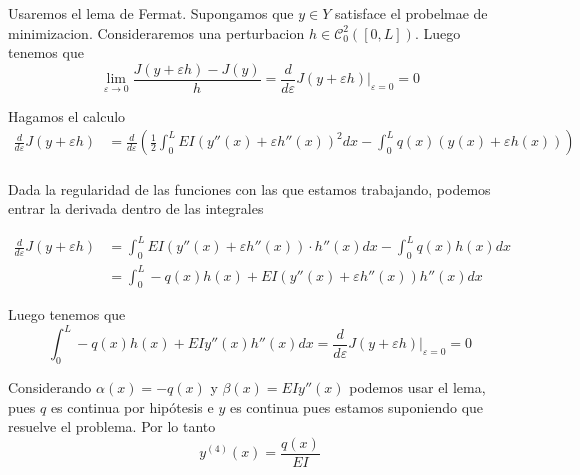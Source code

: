 \documentclass[a4paper,oneside,10.5pt]{USMArt}
\begin{document}
\begin{sol}
  Usaremos el lema de Fermat. Supongamos que $y \in Y$ satisface el probelmae de minimizacion. Consideraremos una perturbacion $h \in \mathcal{C}_{0}^{2}([0, L])$. Luego tenemos que
  \begin{equation*}
    \lim_{\varepsilon \to 0} \frac{J(y + \varepsilon h) - J(y)}{h} = \frac{d}{d \varepsilon} J(y + \varepsilon h)\big|_{\varepsilon = 0} = 0
  \end{equation*}

  Hagamos el calculo
  \begin{align*}
    \frac{d}{d \varepsilon} J(y + \varepsilon h) &= \frac{d}{d \varepsilon}(\frac12 \int_{0}^{L} EI(y''(x) + \varepsilon h''(x))^{2} dx - \int_{0}^{L} q(x)(y(x) + \varepsilon h(x)))\\
  \end{align*}

  Dada la regularidad de las funciones con las que estamos trabajando, podemos entrar la derivada dentro de las integrales

  \begin{align*}
    \frac{d}{d \varepsilon} J(y + \varepsilon h) &= \int_{0}^{L} EI(y''(x) + \varepsilon h''(x)) \cdot h''(x) dx - \int_{0}^{L} q(x)h(x) dx\\
                                                 &= \int_{0}^{L} -q(x)h(x) + EI(y''(x) + \varepsilon h''(x))h''(x) dx
  \end{align*}

  Luego tenemos que
  \begin{equation*}
    \int_{0}^{L} -q(x)h(x) + EIy''(x)h''(x) dx = \frac{d}{d \varepsilon} J(y + \varepsilon h)|_{\varepsilon = 0} = 0
  \end{equation*}

  Considerando $\alpha(x) = -q(x)$ y $\beta(x) = EIy''(x)$ podemos usar el lema, pues $q$ es continua por hipótesis e $y$ es continua pues estamos suponiendo que resuelve el problema. Por lo tanto
  \begin{equation*}
    y^{(4)}(x) = \frac{q(x)}{EI}
  \end{equation*}
\end{sol}
\end{document}
